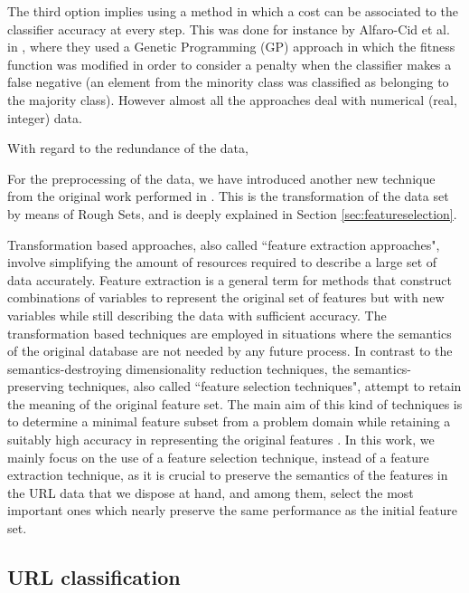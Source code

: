 \documentclass{llncs}
\begin{document}
The third option implies using a method in which a cost can be associated to the classifier accuracy at every step. This was done for instance by Alfaro-Cid et al. in \cite{cost_adjustment_07}, where they used a Genetic Programming (GP) approach in which the fitness function was modified in order to consider a penalty when the classifier makes a false negative (an element from the minority class was classified as belonging to the majority class).
However almost all the approaches deal with numerical (real, integer) data.

With regard to the redundance of the data, %

For the preprocessing of the data, we have introduced another new technique from the original work performed in \cite{ECTA}. This is the transformation of the data set by means of Rough Sets, and is deeply explained in Section \ref{sec:featureselection}.

Transformation based approaches, also called ``feature extraction approaches", involve simplifying the amount of resources required to describe a large set of data accurately. Feature extraction is a general term for methods that construct combinations of variables to represent the original set of features but with new variables while still describing the data with sufficient accuracy. The transformation based techniques are employed in situations where the semantics of the original database are not needed by any future process. In contrast to the semantics-destroying dimensionality reduction techniques, the semantics-preserving techniques, also called ``feature selection techniques", attempt to retain the meaning of the original feature set. The main aim of this kind of techniques is to determine a minimal feature subset from a problem domain while retaining a suitably high accuracy in representing the original features \cite{liu1998feature}. In this work, we mainly focus on the use of a feature selection technique, instead of a feature extraction technique, as it is crucial to preserve the semantics of the features in the URL data that we dispose at hand, and among them, select the most important ones which nearly preserve  the same performance as the initial feature set.

%
\subsection{URL classification}
\label{subsec:urlclassification}
\end{document}
